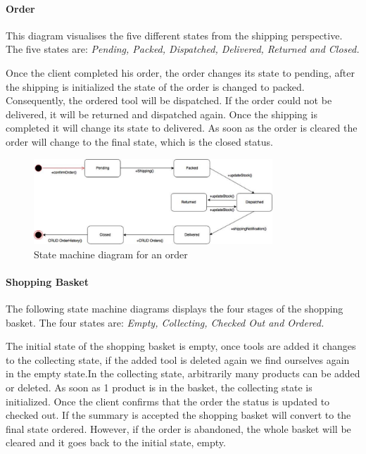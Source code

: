 \documentclass[fontsize=11pt]{extarticle}
\numberwithin{figure}{section} %
\numberwithin{table}{section}%
\let\oldparagraph\paragraph
\renewcommand{\paragraph}[1]{\oldparagraph{#1}\mbox{}}
\begin{document}
\hypertarget{order}{%
\paragraph{Order}\label{order}}

This diagram visualises the five different states from the shipping
perspective. The five states are:
\textit{Pending, Packed, Dispatched, Delivered, Returned and Closed.}

Once the client completed his order, the order changes its state to
pending, after the shipping is initialized the state of the order is
changed to packed. Consequently, the ordered tool will be dispatched. If
the order could not be delivered, it will be returned and dispatched
again. Once the shipping is completed it will change its state to
delivered. As soon as the order is cleared the order will change to the
final state, which is the closed status.

\begin{figure}[H]
      \centering
      \includegraphics[trim = 0 0 0 0, clip, width=0.8\textwidth]{TempImg/OrderSM.png}
      \caption{State machine diagram for an order}
\end{figure}

\hypertarget{shopping-basket}{%
\paragraph{Shopping Basket}\label{shopping-basket}}

The following state machine diagrams displays the four stages of the
shopping basket. The four states are:
\textit{Empty, Collecting, Checked Out and Ordered.}

The initial state of the shopping basket is empty, once tools are added
it changes to the collecting state, if the added tool is deleted again
we find ourselves again in the empty state.In the collecting state,
arbitrarily many products can be added or deleted. As soon as 1 product
is in the basket, the collecting state is initialized. Once the client
confirms that the order the status is updated to checked out. If the
summary is accepted the shopping basket will convert to the final state
ordered. However, if the order is abandoned, the whole basket will be
cleared and it goes back to the initial state, empty.
\end{document}
